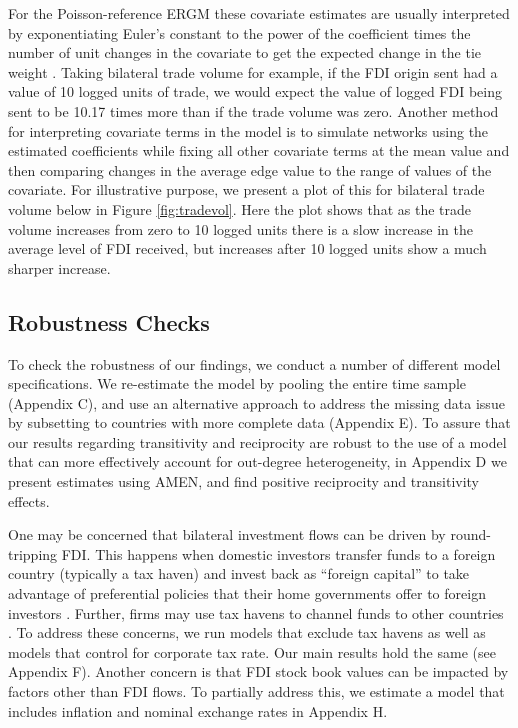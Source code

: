 \documentclass[reqno,onecolumn,letterpaper,12pt]{article}
\begin{document}
For the Poisson-reference ERGM these covariate estimates are usually interpreted by exponentiating Euler's constant to the power of the coefficient times the number of unit changes in the covariate to get the expected change in the tie weight \citep{krivitsky2013modeling}. Taking bilateral trade volume for example, if the FDI origin sent had a value of 10 logged units of trade, we would expect the value of logged FDI being sent to be 10.17 times more than if the trade volume was zero. Another method for interpreting covariate terms in the model is to simulate networks using the estimated coefficients while fixing all other covariate terms at the mean value and then comparing changes in the average edge value to the range of values of the covariate. For illustrative purpose, we present a plot of this for bilateral trade volume below in Figure \ref{fig:tradevol}. Here the plot shows that as the trade volume increases from zero to 10 logged units there is a slow increase in the average level of FDI received, but increases after 10 logged units show a much sharper increase.

\subsection{Robustness Checks}\label{robust}

To check the robustness of our findings, we conduct a number of different model specifications. We re-estimate the model by pooling the entire time sample (Appendix C), and use an alternative approach to address the missing data issue by subsetting to countries with more complete data (Appendix E). To assure that our results regarding transitivity and reciprocity are robust to the use of a model that can more effectively account for out-degree heterogeneity, in Appendix D we present estimates using AMEN, and find positive reciprocity and transitivity effects. 

One may be concerned that bilateral investment flows can be driven by round-tripping FDI. This happens when domestic investors transfer funds to a foreign country (typically a tax haven) and invest back as ``foreign capital'' to take advantage of preferential policies that their home governments offer to foreign investors \citep{Borga:2016}. Further, firms may use tax havens to channel funds to other countries \citep{Borga:2017}. To address these concerns, we run models that exclude tax havens as well as models that control for corporate tax rate. Our main results hold the same (see Appendix F). Another concern is that FDI stock book values can be impacted by factors other than FDI flows. To partially address this, we estimate a model that includes inflation and nominal exchange rates in Appendix H.
\end{document}
